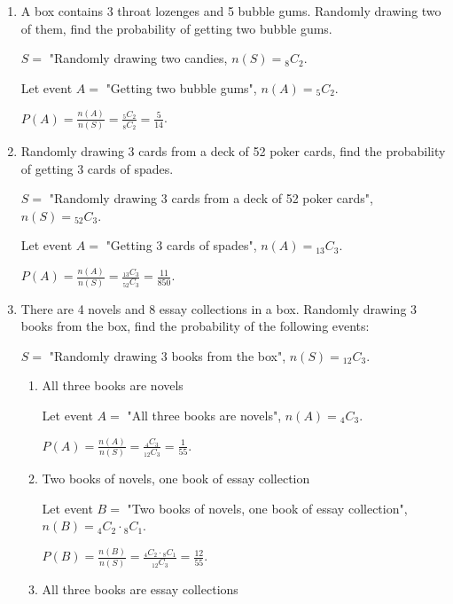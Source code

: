 \documentclass{report}
\newcommand\comb[2][^n]{{}_{#1}C_{#2}}
\begin{document}
\begin{multicols}{2}
\begin{enumerate}
    \item A box contains 3 throat lozenges and 5 bubble gums. Randomly drawing two of
          them, find the probability of getting two bubble gums. \sol{}

          $S =$ "Randomly drawing two candies, $n(S) = \comb[8]{2}$.

          Let event $A =$ "Getting two bubble gums", $n(A) = \comb[5]{2}$.

          $P(A) = \frac{n(A)}{n(S)} = \frac{\comb[5]{2}}{\comb[8]{2}} = \frac{5}{14}$.

    \item Randomly drawing 3 cards from a deck of 52 poker cards, find the probability of
          getting 3 cards of spades. \sol{}

          $S =$ "Randomly drawing 3 cards from a deck of 52 poker cards", $n(S) = \comb[52]{3}$.

          Let event $A =$ "Getting 3 cards of spades", $n(A) = \comb[13]{3}$.

          $P(A) = \frac{n(A)}{n(S)} = \frac{\comb[13]{3}}{\comb[52]{3}} = \frac{11}{850}$.

    \item There are 4 novels and 8 essay collections in a box. Randomly drawing 3 books
          from the box, find the probability of the following events: \sol{}

          $S =$ "Randomly drawing 3 books from the box", $n(S) = \comb[12]{3}$.

          \begin{enumerate}
            \item All three books are novels \sol{}

                  Let event $A =$ "All three books are novels", $n(A) = \comb[4]{3}$.

                  $P(A) = \frac{n(A)}{n(S)} = \frac{\comb[4]{3}}{\comb[12]{3}} = \frac{1}{55}$.

            \item Two books of novels, one book of essay collection \sol{}

                  Let event $B =$ "Two books of novels, one book of essay collection", $n(B) =
                    \comb[4]{2} \cdot \comb[8]{1}$.

                  $P(B) = \frac{n(B)}{n(S)} = \frac{\comb[4]{2} \cdot \comb[8]{1}}{\comb[12]{3}} = \frac{12}{55}$.

            \item All three books are essay collections \sol{}


\end{enumerate}
\end{enumerate}
\end{multicols}
\end{document}
